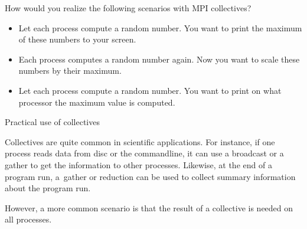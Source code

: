\begin{comment}
  for instance to print them out.
  If you perform an operation on the data from the processors,
  for instance to compute the maximum value, this is known
  as a \indexterm{reduction} (section~\ref{sec:bcast}).
  On the other hand, if you need to collect and preserve
  all computation results, the operation is known
  as a \indexterm{gather} (section~\ref{sec:gatherscatter}).

  Conversely, one process can have data that needs to be
  spread to all others, for instance because it reads it from file.
  If the same item needs to be sent to all processes, this
  is known as \indexterm{broadcast}.
  If the root process sends individual data to each process,
  it is called a \indexterm{scatter}.
\end{comment}

\begin{exercise}
  \label{ex:collective-cases}
  How would you realize the following scenarios with MPI collectives?
  \begin{itemize}
  \item Let each process compute a random number. You want to print the
    maximum of these numbers to your screen.
  \item Each process computes a random number again. Now you want to
    scale these numbers by their maximum. 
  \item Let each process compute a random number. You want to print on what processor the
    maximum value is computed. 
  \end{itemize}
\end{exercise}

 {Practical use of collectives}

Collectives are quite common in scientific applications. For instance,
if one process reads data from disc or the commandline, it can use a
broadcast or a gather to get the information to other
processes. Likewise, at the end of a program run, a~gather or
reduction can be used to collect summary information about the program
run.

However, a more common scenario is 
that the result of a collective is needed on all processes.

